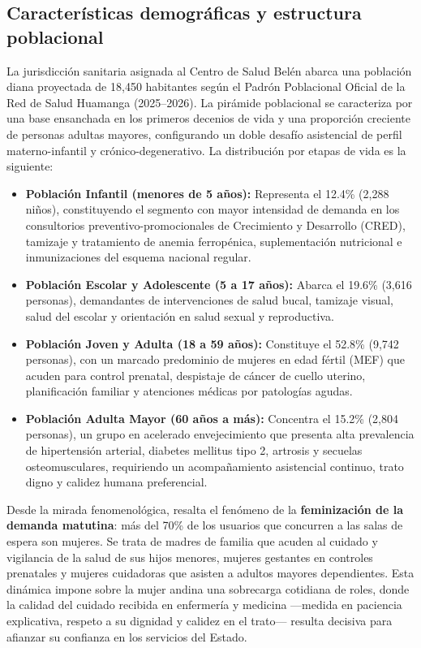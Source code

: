 \subsection{Características demográficas y estructura poblacional}
\label{sec:2.2_demografia}

La jurisdicción sanitaria asignada al Centro de Salud Belén abarca una población diana proyectada de 18,450 habitantes según el Padrón Poblacional Oficial de la Red de Salud Huamanga (2025--2026). La pirámide poblacional se caracteriza por una base ensanchada en los primeros decenios de vida y una proporción creciente de personas adultas mayores, configurando un doble desafío asistencial de perfil materno-infantil y crónico-degenerativo. La distribución por etapas de vida es la siguiente:
\begin{itemize}
    \item \textbf{Población Infantil (menores de 5 años):} Representa el 12.4\% (2,288 niños), constituyendo el segmento con mayor intensidad de demanda en los consultorios preventivo-promocionales de Crecimiento y Desarrollo (CRED), tamizaje y tratamiento de anemia ferropénica, suplementación nutricional e inmunizaciones del esquema nacional regular.
    \item \textbf{Población Escolar y Adolescente (5 a 17 años):} Abarca el 19.6\% (3,616 personas), demandantes de intervenciones de salud bucal, tamizaje visual, salud del escolar y orientación en salud sexual y reproductiva.
    \item \textbf{Población Joven y Adulta (18 a 59 años):} Constituye el 52.8\% (9,742 personas), con un marcado predominio de mujeres en edad fértil (MEF) que acuden para control prenatal, despistaje de cáncer de cuello uterino, planificación familiar y atenciones médicas por patologías agudas.
    \item \textbf{Población Adulta Mayor (60 años a más):} Concentra el 15.2\% (2,804 personas), un grupo en acelerado envejecimiento que presenta alta prevalencia de hipertensión arterial, diabetes mellitus tipo 2, artrosis y secuelas osteomusculares, requiriendo un acompañamiento asistencial continuo, trato digno y calidez humana preferencial.
\end{itemize}

Desde la mirada fenomenológica, resalta el fenómeno de la \textbf{feminización de la demanda matutina}: más del 70\% de los usuarios que concurren a las salas de espera son mujeres. Se trata de madres de familia que acuden al cuidado y vigilancia de la salud de sus hijos menores, mujeres gestantes en controles prenatales y mujeres cuidadoras que asisten a adultos mayores dependientes. Esta dinámica impone sobre la mujer andina una sobrecarga cotidiana de roles, donde la calidad del cuidado recibida en enfermería y medicina —medida en paciencia explicativa, respeto a su dignidad y calidez en el trato— resulta decisiva para afianzar su confianza en los servicios del Estado.

